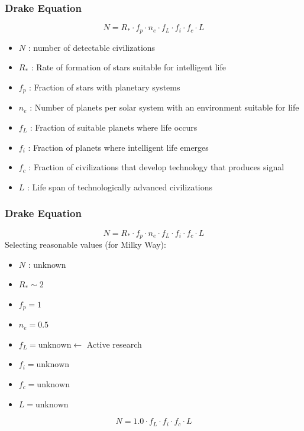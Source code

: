 \documentclass{beamer}
\begin{document}
\begin{frame}
\frametitle{Drake Equation}
$$ N = R_{*} \cdot f_{p} \cdot n_{e} \cdot f_{L} \cdot f_{i} \cdot f_{c} \cdot L$$
\begin{itemize}
    \item $N$ : number of detectable civilizations 
    \item $R_{*}$ : Rate of formation of stars suitable for intelligent life
    \item $f_{p}$ : Fraction of stars with planetary systems
    \item $n_{e}$ : Number of planets per solar system with an environment suitable for life
    \item $f_{L}$ : Fraction of suitable planets where life occurs
    \item $f_{i}$ : Fraction of planets where intelligent life emerges
    \item $f_{c}$ : Fraction of civilizations that develop technology that produces signal
    \item $L$     : Life span of technologically advanced civilizations
\end{itemize}
\end{frame}


\begin{frame}
\frametitle{Drake Equation}
$$ N = R_{*} \cdot f_{p} \cdot n_{e} \cdot f_{L} \cdot f_{i} \cdot f_{c} \cdot L$$
Selecting reasonable values (for Milky Way): 
\begin{itemize}
    \item $N$ : unknown
    \item $R_{*} \sim 2$
    \item $f_{p} = 1$
    \item $n_{e} = 0.5$ %
    \item $f_{L} = \text{unknown} \leftarrow $ Active research
    \item $f_{i} = \text{unknown}$
    \item $f_{c} = \text{unknown}$ 
    \item $L     = \text{unknown}$ 
\end{itemize}
\pause
$$ N = 1.0 \cdot f_{L} \cdot f_{i} \cdot f_{c} \cdot L$$
\end{frame}
\end{document}
